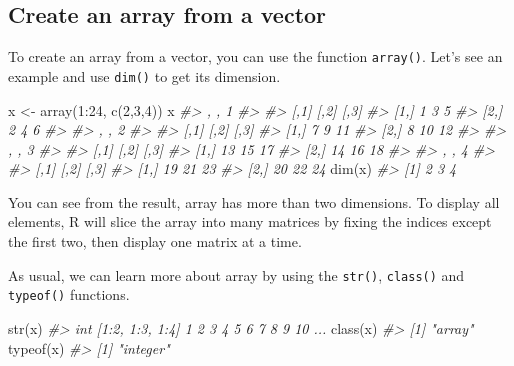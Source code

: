 \documentclass[
]{book}
\newenvironment{Shaded}{\begin{snugshade}}{\end{snugshade}}
\newcommand{\CommentTok}[1]{\textcolor[rgb]{0.56,0.35,0.01}{\textit{#1}}}
\newcommand{\DecValTok}[1]{\textcolor[rgb]{0.00,0.00,0.81}{#1}}
\newcommand{\FunctionTok}[1]{\textcolor[rgb]{0.00,0.00,0.00}{#1}}
\newcommand{\NormalTok}[1]{#1}
\newcommand{\OtherTok}[1]{\textcolor[rgb]{0.56,0.35,0.01}{#1}}
\newcommand{\SpecialCharTok}[1]{\textcolor[rgb]{0.00,0.00,0.00}{#1}}
\begin{document}
\hypertarget{create-an-array-from-a-vector}{%
\subsection{Create an array from a vector}\label{create-an-array-from-a-vector}}

To create an array from a vector, you can use the function \texttt{array()}. Let's see an example and use \texttt{dim()} to get its dimension.

\begin{Shaded}
\begin{Highlighting}[]
\NormalTok{x }\OtherTok{\textless{}{-}} \FunctionTok{array}\NormalTok{(}\DecValTok{1}\SpecialCharTok{:}\DecValTok{24}\NormalTok{, }\FunctionTok{c}\NormalTok{(}\DecValTok{2}\NormalTok{,}\DecValTok{3}\NormalTok{,}\DecValTok{4}\NormalTok{))}
\NormalTok{x}
\CommentTok{\#\textgreater{} , , 1}
\CommentTok{\#\textgreater{} }
\CommentTok{\#\textgreater{}      [,1] [,2] [,3]}
\CommentTok{\#\textgreater{} [1,]    1    3    5}
\CommentTok{\#\textgreater{} [2,]    2    4    6}
\CommentTok{\#\textgreater{} }
\CommentTok{\#\textgreater{} , , 2}
\CommentTok{\#\textgreater{} }
\CommentTok{\#\textgreater{}      [,1] [,2] [,3]}
\CommentTok{\#\textgreater{} [1,]    7    9   11}
\CommentTok{\#\textgreater{} [2,]    8   10   12}
\CommentTok{\#\textgreater{} }
\CommentTok{\#\textgreater{} , , 3}
\CommentTok{\#\textgreater{} }
\CommentTok{\#\textgreater{}      [,1] [,2] [,3]}
\CommentTok{\#\textgreater{} [1,]   13   15   17}
\CommentTok{\#\textgreater{} [2,]   14   16   18}
\CommentTok{\#\textgreater{} }
\CommentTok{\#\textgreater{} , , 4}
\CommentTok{\#\textgreater{} }
\CommentTok{\#\textgreater{}      [,1] [,2] [,3]}
\CommentTok{\#\textgreater{} [1,]   19   21   23}
\CommentTok{\#\textgreater{} [2,]   20   22   24}
\FunctionTok{dim}\NormalTok{(x)}
\CommentTok{\#\textgreater{} [1] 2 3 4}
\end{Highlighting}
\end{Shaded}

You can see from the result, array has more than two dimensions. To display all elements, R will slice the array into many matrices by fixing the indices except the first two, then display one matrix at a time.

As usual, we can learn more about array by using the \texttt{str()}, \texttt{class()} and \texttt{typeof()} functions.

\begin{Shaded}
\begin{Highlighting}[]
\FunctionTok{str}\NormalTok{(x)}
\CommentTok{\#\textgreater{}  int [1:2, 1:3, 1:4] 1 2 3 4 5 6 7 8 9 10 ...}
\FunctionTok{class}\NormalTok{(x)}
\CommentTok{\#\textgreater{} [1] "array"}
\FunctionTok{typeof}\NormalTok{(x)}
\CommentTok{\#\textgreater{} [1] "integer"}
\end{Highlighting}
\end{Shaded}
\end{document}
